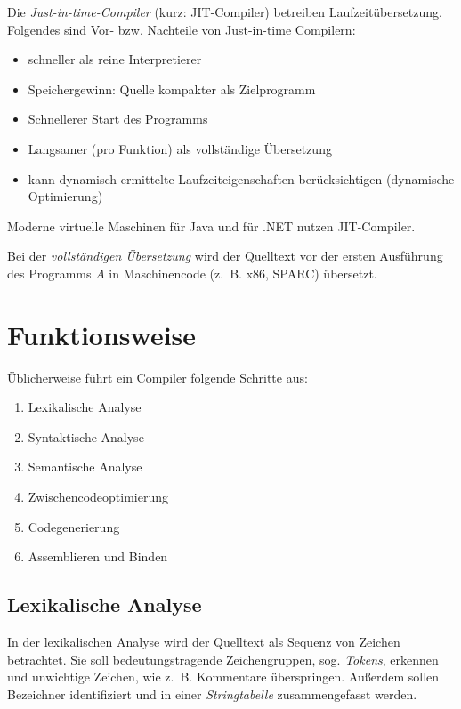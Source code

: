 
Die \textit{Just-in-time-Compiler} (kurz: JIT-Compiler) betreiben
Laufzeitübersetzung. Folgendes sind Vor- bzw. Nachteile von Just-in-time Compilern:
\begin{itemize}
	\item schneller als reine Interpretierer
	\item Speichergewinn: Quelle kompakter als Zielprogramm
	\item Schnellerer Start des Programms
	\item Langsamer (pro Funktion) als vollständige Übersetzung
	\item kann dynamisch ermittelte Laufzeiteigenschaften berücksichtigen (dynamische Optimierung)
\end{itemize}

Moderne virtuelle Maschinen für Java und für .NET nutzen JIT-Compiler.

Bei der \textit{vollständigen Übersetzung} wird der Quelltext vor der ersten
Ausführung des Programms $A$ in Maschinencode (z.~B. x86, SPARC) übersetzt.


\section{Funktionsweise}
Üblicherweise führt ein Compiler folgende Schritte aus:
\begin{enumerate}
	\item Lexikalische Analyse
	\item Syntaktische Analyse
	\item Semantische Analyse
	\item Zwischencodeoptimierung
	\item Codegenerierung
    \item Assemblieren und Binden
\end{enumerate}

\subsection{Lexikalische Analyse}%
In der lexikalischen Analyse wird der Quelltext als Sequenz von Zeichen betrachtet.
Sie soll bedeutungstragende Zeichengruppen, sog. \textit{Tokens},
erkennen und unwichtige Zeichen, wie z.~B. Kommentare überspringen. Außerdem
sollen Bezeichner identifiziert und in einer \textit{Stringtabelle}
zusammengefasst werden.

